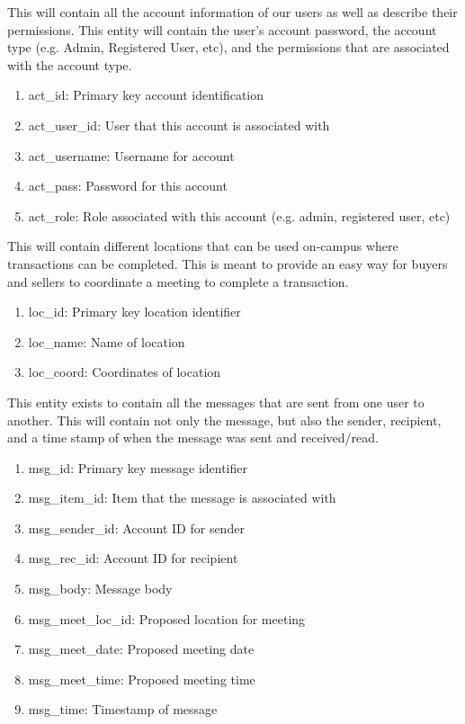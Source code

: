\begin{description}[font=\bfseries\itshape]
\item[account:] This will contain all the account information of our users as well as describe their permissions.  This entity will contain the user's account password, the account type (e.g. Admin, Registered User, etc), and the permissions that are associated with the account type.
\begin{enumerate}
\item act\_id: Primary key account identification
\item act\_user\_id: User that this account is associated with
\item act\_username: Username for account
\item act\_pass: Password for this account
\item act\_role: Role associated with this account (e.g. admin, registered user, etc)
\end{enumerate}

\item[location:] This will contain different locations that can be used on-campus where transactions can be completed.  This is meant to provide an easy way for buyers and sellers to coordinate a meeting to complete a transaction.
\begin{enumerate}
\item loc\_id: Primary key location identifier
\item loc\_name: Name of location
\item loc\_coord: Coordinates of location
\end{enumerate}
	
\item[message:] This entity exists to contain all the messages that are sent from one user to another.  This will contain not only the message, but also the sender, recipient, and a time stamp of when the message was sent and received/read.
\begin{enumerate}
\item msg\_id: Primary key message identifier
\item msg\_item\_id: Item that the message is associated with
\item msg\_sender\_id: Account ID for sender
\item msg\_rec\_id: Account ID for recipient
\item msg\_body: Message body
\item msg\_meet\_loc\_id: Proposed location for meeting
\item msg\_meet\_date: Proposed meeting date
\item msg\_meet\_time: Proposed meeting time
\item msg\_time: Timestamp of message
\end{enumerate}
	

\end{description}
